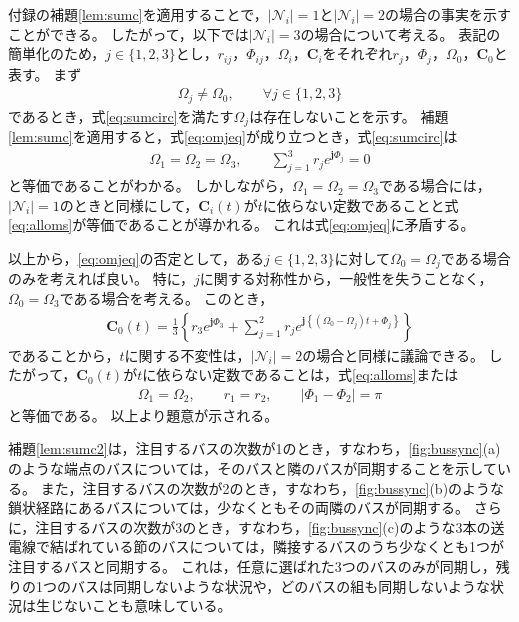 \documentclass[tombow,dvipdfmx]{corona-a5}
\begin{document}
\begin{証明}
付録の補題\ref{lem:sumc}を適用することで，$|\mathcal{N}_i|=1$と$|\mathcal{N}_i|=2$の場合の事実を示すことができる。
したがって，以下では$|\mathcal{N}_i|=3$の場合について考える。
表記の簡単化のため，$j \in\{1,2,3\}$とし，$r_{ij}$，$\Phi_{ij}$，$\Omega_i$，$\bm{C}_i$をそれぞれ$r_{j}$，$\Phi_{j}$，$\Omega_0$，$\bm{C}_0$と表す。
まず
\begin{align}\label{eq:omjeq}
\Omega_j \neq \Omega_0
,\qquad \forall j \in \{1,2,3\}
\end{align}
であるとき，式\ref{eq:sumcirc}を満たす$\Omega_j$は存在しないことを示す。
補題\ref{lem:sumc}を適用すると，式\ref{eq:omjeq}が成り立つとき，式\ref{eq:sumcirc}は
\begin{align*}
\Omega_1 = \Omega_2 = \Omega_3,\qquad
\sum_{j=1}^3 
r_j e^{\bm{j} \Phi_j}=0
\end{align*}
と等価であることがわかる。
しかしながら，$\Omega_1 = \Omega_2 = \Omega_3$である場合には，$|\mathcal{N}_i|=1$のときと同様にして，$\bm{C}_i (t)$が$t$に依らない定数であることと式\ref{eq:alloms}が等価であることが導かれる。
これは式\ref{eq:omjeq}に矛盾する。

以上から，\ref{eq:omjeq}の否定として，ある$j\in\{1,2,3\}$に対して$\Omega_0=\Omega_j$である場合のみを考えれば良い。
特に，$j$に関する対称性から，一般性を失うことなく，$\Omega_0=\Omega_3$である場合を考える。
このとき，
\begin{align*}
\bm{C}_0 (t) = \frac{1}{3} \left\{
r_3 e^{\bm{j} \Phi_3}
+
\sum_{j=1}^2
r_{j}
e^{\bm{j} 
\left\{
(\Omega_0 - \Omega_j)t + 
\Phi_{j}
\right\} }
\right\}
\end{align*}
であることから，$t$に関する不変性は，$|\mathcal{N}_i|=2$の場合と同様に議論できる。
したがって，$\bm{C}_0 (t)$が$t$に依らない定数であることは，式\ref{eq:alloms}または
\begin{align*}
\Omega_{1} = \Omega_{2}
,\qquad
r_{1} = r_{2}
,\qquad
|\Phi_{1}-\Phi_{2}| = \pi
\end{align*}
と等価である。
以上より題意が示される。
\end{証明}

補題\ref{lem:sumc2}は，注目するバスの次数が1のとき，すなわち，\ref{fig:bussync}(a)のような端点のバスについては，そのバスと隣のバスが同期することを示している。
また，注目するバスの次数が2のとき，すなわち，\ref{fig:bussync}(b)のような鎖状経路にあるバスについては，少なくともその両隣のバスが同期する。
さらに，注目するバスの次数が3のとき，すなわち，\ref{fig:bussync}(c)のような3本の送電線で結ばれている節のバスについては，隣接するバスのうち少なくとも1つが注目するバスと同期する。
これは，任意に選ばれた3つのバスのみが同期し，残りの1つのバスは同期しないような状況や，どのバスの組も同期しないような状況は生じないことも意味している。
\end{document}
